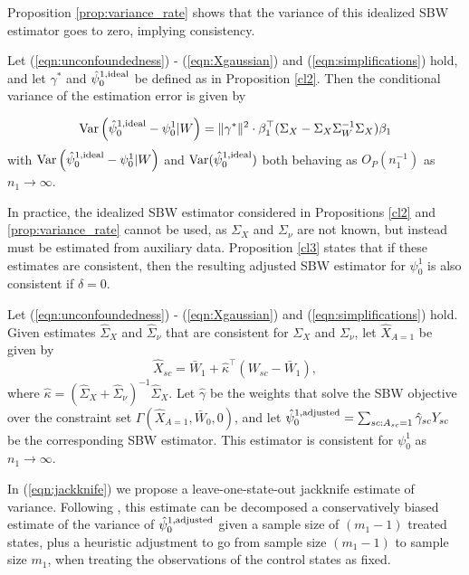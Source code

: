 Proposition \ref{prop:variance_rate} shows that the variance of this idealized SBW estimator goes to zero, implying consistency. 
\begin{proposition}\label{prop:variance_rate}
Let (\ref{eqn:unconfoundedness}) - (\ref{eqn:Xgaussian}) and (\ref{eqn:simplifications}) hold, and let $\gamma^*$ and $\hat{\psi}_0^{1, \textup{ideal}}$ be defined as in Proposition \ref{cl2}. Then the conditional variance of the estimation error is given by

\begin{align*}
\operatorname{Var}\left( \hat{\psi}_0^{1, \textup{ideal}} - \psi_0^1| W\right)  = \|\gamma^*\|^2 \cdot \beta_1^\top(\Sigma_{X} - \Sigma_{X}\Sigma_{W}^{-1}\Sigma_{X})\beta_1
\end{align*}
with $\operatorname{Var}\left( \hat{\psi}_0^{1, \textup{ideal}} - \psi_0^1| W\right)$ and $\operatorname{Var}(\hat{\psi}_0^{1,\textup{ideal}})$ both behaving as $O_P(n_1^{-1})$ as $n_1 \rightarrow \infty$.
\end{proposition}

In practice, the idealized SBW estimator considered in Propositions \ref{cl2} and \ref{prop:variance_rate} cannot be used, as $\Sigma_X$ and $\Sigma_{\nu}$ are not known, but instead must be estimated from auxiliary data. Proposition \ref{cl3} states that if these estimates are consistent, then the resulting adjusted SBW estimator for $\psi_0^1$ is also consistent if $\delta = 0$.

\begin{proposition}\label{cl3}
Let (\ref{eqn:unconfoundedness}) - (\ref{eqn:Xgaussian}) and (\ref{eqn:simplifications}) hold. Given estimates $\hat{\Sigma}_X$ and $\hat{\Sigma}_\nu$ that are consistent for $\Sigma_X$ and $\Sigma_\nu$, let $\hat{X}_{A=1}$ be given by 
\[ \hat{X}_{sc} = \bar{W}_1 + \hat{\kappa}^\top(W_{sc} - \bar{W}_1), \]
where $\hat{\kappa} = (\hat{\Sigma}_X + \hat{\Sigma}_{\nu})^{-1} \hat{\Sigma}_X$. Let $\hat{\gamma}$ be the weights that solve the SBW objective over the constraint set $\Gamma(\hat{X}_{A=1}, \bar{W}_0, 0)$, and let $\hat{\psi}^{1, \textup{adjusted}}_0 = \sum_{sc: A_{sc} = 1} \hat{\gamma}_{sc} Y_{sc}$ be the corresponding SBW estimator. This estimator is consistent for $\psi_0^1$ as $n_1 \to \infty$.
\end{proposition}

In (\ref{eqn:jackknife}) we propose a leave-one-state-out jackknife estimate of variance. Following \cite{efron1981jackknife}, this estimate can be decomposed a conservatively biased estimate of the variance of $\hat{\psi}_0^{1, \textup{adjusted}}$ given a sample size of $(m_1-1)$ treated states, plus a heuristic adjustment to go from sample size $(m_1-1)$ to sample size $m_1$, when treating the observations of the control states as fixed.

